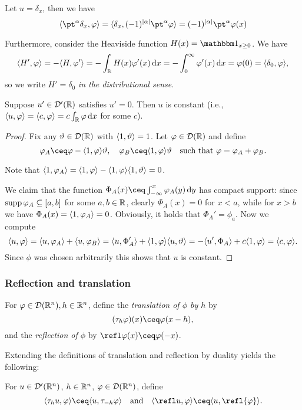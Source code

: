 \begin{example}
    Let $u = \delta_x$, then we have
    \[
    \ang{\pt^\alpha \delta_x, \phi} = \ang{\delta_x, (-1)^\abs{\alpha} \pt^\alpha\phi} = (-1)^\abs{\alpha} \pt^\alpha \phi(x)
    \]
    
    Furthermore, consider the Heaviside function $H(x) = \ind_{x \geq 0}$. We have
    \[
    \langle H', \varphi\rangle = - \langle H, \varphi'\rangle = -\int_\mathbb R H(x) \varphi'(x) \dd{x} = - \int_0^\infty \varphi'(x) \dd{x} = \varphi(0) = \langle\delta_0, \varphi\rangle, 
    \]
    so we write $H'= \delta_0$ \emph{in the distributional sense}. 
\end{example}

\begin{lemma}
    Suppose $u' \in \mathcal D'(\mathbb R)$ satisfies $u' = 0$. Then $u$ is constant (i.e., $\langle u, \varphi\rangle = \langle c, \varphi\rangle = c \int_\mathbb R \varphi \dd{x}$ for some $c$). 
\end{lemma}

\begin{proof}
    Fix  any $\vartheta \in \mathcal D(\mathbb R)$ with $\langle1, \vartheta\rangle = 1$. Let $\varphi \in \mathcal D(\mathbb R)$ and define
    \[
    \phi_A \ceq \phi - \ang{1, \phi}\theta, \quad \phi_B \ceq \ang{1, \phi}\theta \quad\text{such that }\phi = \phi_A + \phi_B.
    \]
    
    Note that $\langle1, \varphi_A\rangle = \langle1, \varphi\rangle - \langle1, \varphi\rangle\langle1, \vartheta\rangle = 0$.
    
    We claim that the function $\Phi_A(x) \ceq \int_{-\infty}^x \phi_A(y) \dd{y}$ has compact support: since $\operatorname{supp}\varphi_A \subseteq [a, b]$ for some $a, b \in \mathbb R$, clearly $\Phi_A(x) = 0$ for $x < a$, while for $x > b$ we have $\Phi_A(x) = \langle1, \varphi_A\rangle = 0$. 
    Obviously, it holds that $\Phi_A' = \phi_a$. Now we compute
    \[
    \langle u, \varphi\rangle = \langle u, \varphi_A\rangle + \langle u, \varphi_B\rangle = \langle u, \Phi_A'\rangle + \langle1, \varphi\rangle\langle u, \vartheta\rangle = - \langle u', \Phi_A\rangle + c \langle1, \varphi\rangle = \langle c, \varphi\rangle. 
    \]
    Since $\phi$ was chosen arbitrarily this shows that $u$ is constant. 
\end{proof}

\subsubsection{Reflection and translation} 
For $\varphi \in \mathcal D(\mathbb R^n), h \in \mathbb R^n$, define the \emph{translation of $\phi$ by $h$} by 
\[
(\tau_h\phi)(x) \ceq \phi(x - h),
\]
and the \emph{reflection of $\phi$} by $\refl\phi(x) \ceq \phi(-x)$. 

Extending the definitions of translation and reflection by duality yields the following:
\begin{definition}
    For $u \in \mathcal D'(\mathbb R^n)$, $h \in \mathbb R^n$, $\varphi \in \mathcal D(\mathbb R^n)$, define
    \[
    \ang{\tau_hu, \phi} \ceq \ang{u, \tau_{-h}\phi} \quad\text{and}\quad \ang{\refl u, \phi} \ceq \ang{u, \refl{\phi}}. 
    \]
\end{definition}

